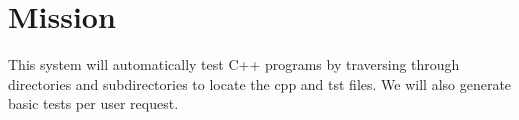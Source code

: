 
\chapter{Mission}

This system will automatically test C++ programs by traversing through directories and subdirectories to locate the cpp and tst files. We will also generate basic tests per user request. 